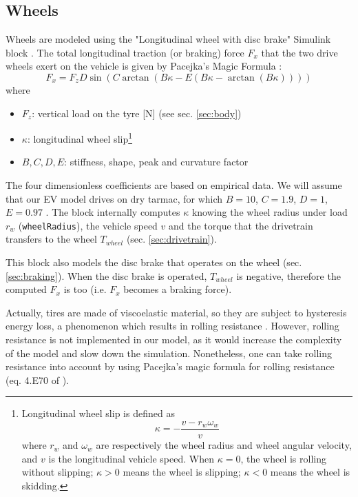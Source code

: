 \subsection{Wheels}
\label{sec:wheels}
Wheels are modeled using the "Longitudinal wheel with disc brake" Simulink block \cite{mathworks:wheel}. The total longitudinal traction (or braking) force $F_x$ that the two drive wheels exert on the vehicle is given by Pacejka's Magic Formula \cite{magic_formula}:
\begin{equation}
F_x = F_z D \sin(C\arctan(B\kappa-E(B\kappa-\arctan(B\kappa))))
\end{equation}
where
\begin{itemize}
    \item $F_z$: vertical load on the tyre [N] (see sec. \ref{sec:body})
    \item $\kappa$: longitudinal wheel slip\footnote{Longitudinal wheel slip is defined as
    \[
    \kappa = -\frac{v-r_w\omega_w}{v}
    \]
    where $r_w$ and $\omega_w$ are respectively the wheel radius and wheel angular velocity, and $v$ is the longitudinal vehicle speed. When $\kappa=0$, the wheel is rolling without slipping; $\kappa>0$ means the wheel is slipping; $\kappa<0$ means the wheel is skidding.}
    \item $B, C, D, E$: stiffness, shape, peak and curvature factor
\end{itemize}
The four dimensionless coefficients are based on empirical data. We will assume that our EV model drives on dry tarmac, for which $B=10$, $C=1.9$, $D=1$, $E=0.97$ \cite{mathworks:wheel}. The block internally computes $\kappa$ knowing the wheel radius under load $r_w$ (\texttt{wheelRadius}), the vehicle speed $v$ and the torque that the drivetrain transfers to the wheel $T_{wheel}$ (sec. \ref{sec:drivetrain}).

This block also models the disc brake that operates on the wheel (sec. \ref{sec:braking}). When the disc brake is operated, $T_{wheel}$ is negative, therefore the computed $F_x$ is too (i.e. $F_x$ becomes a braking force).

Actually, tires are made of viscoelastic material, so they are subject to hysteresis energy loss, a phenomenon which results in rolling resistance \cite{rolling_resistance}. However, rolling resistance is not implemented in our model, as it would increase the complexity of the model and slow down the simulation. Nonetheless, one can take rolling resistance into account by using Pacejka's magic formula for rolling resistance (eq. 4.E70 of \cite{rolling_resistance}).



